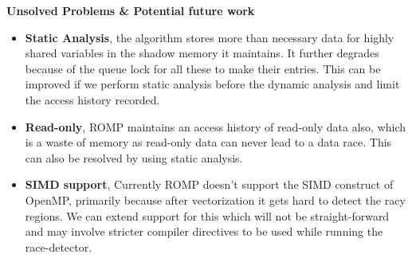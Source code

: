\documentclass[a4paper]{article}
\begin{document}
\vspace{1.0cm}
{\bf\Large Unsolved Problems \& Potential future work} \\
\begin{itemize}
\item {\bf Static Analysis}, the algorithm stores more than necessary data for highly shared variables in the shadow memory it maintains. It further degrades because of the queue lock for all these to make their entries. This can be improved if we perform static analysis before the dynamic analysis and limit the access history recorded.
\item {\bf Read-only}, ROMP maintains an access history of read-only data also, which is a waste of memory as read-only data can never lead to a data race. This can also be resolved by using static analysis.
\item {\bf SIMD support}, Currently ROMP doesn't support the SIMD construct of OpenMP, primarily because after vectorization it gets hard to detect the racy regions. We can extend support for this which will not be straight-forward and may involve stricter compiler directives to be used while running the race-detector.
\end{itemize}
\end{document}
